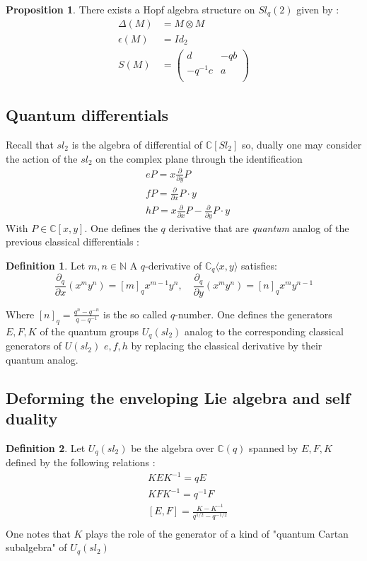 \documentclass{article}
\theoremstyle{definition}
\newtheorem{Prop}{Proposition}[section]
\newtheorem{Def}{Definition}[section]
\begin{document}
\begin{Prop}There exists a Hopf algebra structure on $Sl_q(2)$ given by : \begin{align*}
\Delta(M)&=M\otimes M\\
\epsilon(M)&=Id_2\\
S(M)&=\left( {\begin{array}{cc}
   d & -qb \\
   -q^{-1}c & a \\
  \end{array} } \right)
\end{align*}
\subsection{Quantum differentials}
Recall that $sl_2$ is the algebra of differential of $\mathbb{C}[Sl_2]$ so, dually one may consider the action of the $sl_2$ on the complex plane through the identification \begin{align*}
&eP=x\frac{\partial}{\partial y} P \\
&fP=\frac{\partial}{\partial x} P\cdot y \\
&hP=x\frac{\partial}{\partial x}P-\frac{\partial}{\partial y}P\cdot y 
\end{align*}
With $P\in\mathbb{C}[x,y]$. One defines the $q$ derivative that are \textit{quantum} analog of the previous classical differentials :
\begin{Def} Let $m,n\in\mathbb{N}$ A $q$-derivative  of $\mathbb{C}_q\langle x,y\rangle$ satisfies: $$\frac{\partial_q}{\partial x}(x^my^n)=[m]_qx^{m-1}y^{n}, \quad \frac{\partial_q}{\partial y}(x^my^n)=[n]_qx^{m}y^{n-1}$$ \end{Def}
Where $[n]_q=\frac{q^n-q^{-n}}{q-q^{-1}}$ is the so called $q$-number.
One defines the generators $E,F,K$ of the quantum groups $U_q(sl_2)$ analog to the corresponding classical generators of $U(sl_2)$ $e,f,h$ by replacing the classical derivative by their quantum analog.
\subsection{Deforming the enveloping Lie algebra and self duality}
\begin{Def} Let $U_q(sl_2)$ be the algebra over $\mathbb{C}(q)$ spanned by $E,F,K$ defined by the following relations : \begin{align*}
&KEK^{-1}=qE\\
&KFK^{-1}=q^{-1}F\\
&[E,F]=\frac{K-K^{-1}}{q^{1/2}-q^{-1/2}}\\
\end{align*} One notes that $K$ plays the role of the generator of a kind of "quantum Cartan subalgebra" of $U_q(sl_2)$
\end{Def}
\end{Prop}
\end{document}
